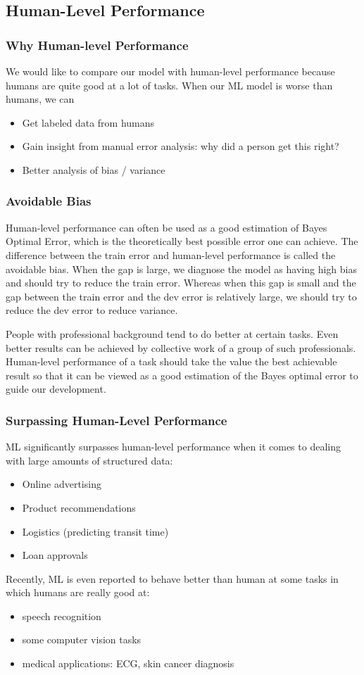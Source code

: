 \subsection{Human-Level Performance}
\subsubsection{Why Human-level Performance}
We would like to compare our model with human-level performance because humans are quite good at a lot of tasks. When our ML model is worse than humans, we can 
\begin{itemize}
  \item Get labeled data from humans
  \item Gain insight from manual error analysis: why did a person get this right?
  \item Better analysis of bias / variance
\end{itemize}
\subsubsection{Avoidable Bias}
Human-level performance can often be used as a good estimation of Bayes Optimal Error, which is the theoretically best possible error one can achieve. The difference between the train error and human-level performance is called the avoidable bias. When the gap is large, we diagnose the model as having high bias and should try to reduce the train error. Whereas when this gap is small and the gap between the train error and the dev error is relatively large, we should try to reduce the dev error to reduce variance.

People with professional background tend to do better at certain tasks. Even better results can be achieved by collective work of a group of such professionals. Human-level performance of a task should take the value the best achievable result so that it can be viewed as a good estimation of the Bayes optimal error to guide our development.
\subsubsection{Surpassing Human-Level Performance}
ML significantly surpasses human-level performance when it comes to dealing with large amounts of structured data:
\begin{itemize}
\item Online advertising
\item Product recommendations
\item Logistics (predicting transit time)
\item Loan approvals
\end{itemize}
Recently, ML is even reported to behave better than human at some tasks in which humans are really good at:
\begin{itemize}
  \item speech recognition
  \item some computer vision tasks
  \item medical applications: ECG, skin cancer diagnosis
\end{itemize}
